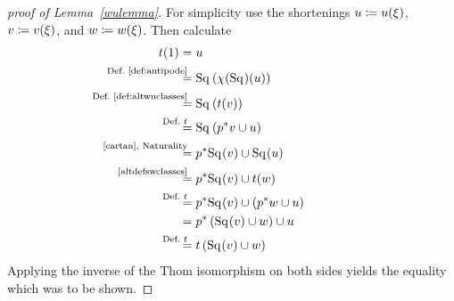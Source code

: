 \begin{proof}[proof of Lemma~\autoref{wulemma}]
  For simplicity use the shortenings
  $u\coloneqq u(\xi)$,
  $v\coloneqq v(\xi)$, and
  $w\coloneqq w(\xi)$.
  Then calculate
  \begin{align*}
    \thomiso(1)
    &= \u
    \\
    &\equalsby{Def.~\autoref{def:antipode}}
      \Sq{}\left(\antipode(\Sq{})(\u)\right)
    \\
    &\equalsby{Def.~\autoref{def:altwuclasses}}
      \Sq{}\left(\thomiso(\v)\right)
    \\
    &\equalsby{Def.~$\thomiso$}
      \Sq{}\left(\pb p\v \cup u\right)
    \\
    &\equalsby{\ref{cartan}, Naturality}
      \pb p\Sq{}(\v) \cup \Sq{}(u)
    \\
    &\equalsby{\autoref{altdefswclasses}}
      \pb p\Sq{}(\v) \cup \thomiso(\w)
    \\
    &\equalsby{Def.~$\thomiso$}
      \pb p\Sq{}(\v) \cup \left(\pb p \w \cup \u\right)
    \\
    &=
      \pb p\left(\Sq{}(\v) \cup \w\right) \cup \u
    \\
    &\equalsby{Def.~$\thomiso$}
      \thomiso\left(\Sq{}(\v) \cup \w\right)
  \end{align*}
  Applying the inverse of the Thom isomorphism on both sides
  yields the equality which was to be shown.
\end{proof}

